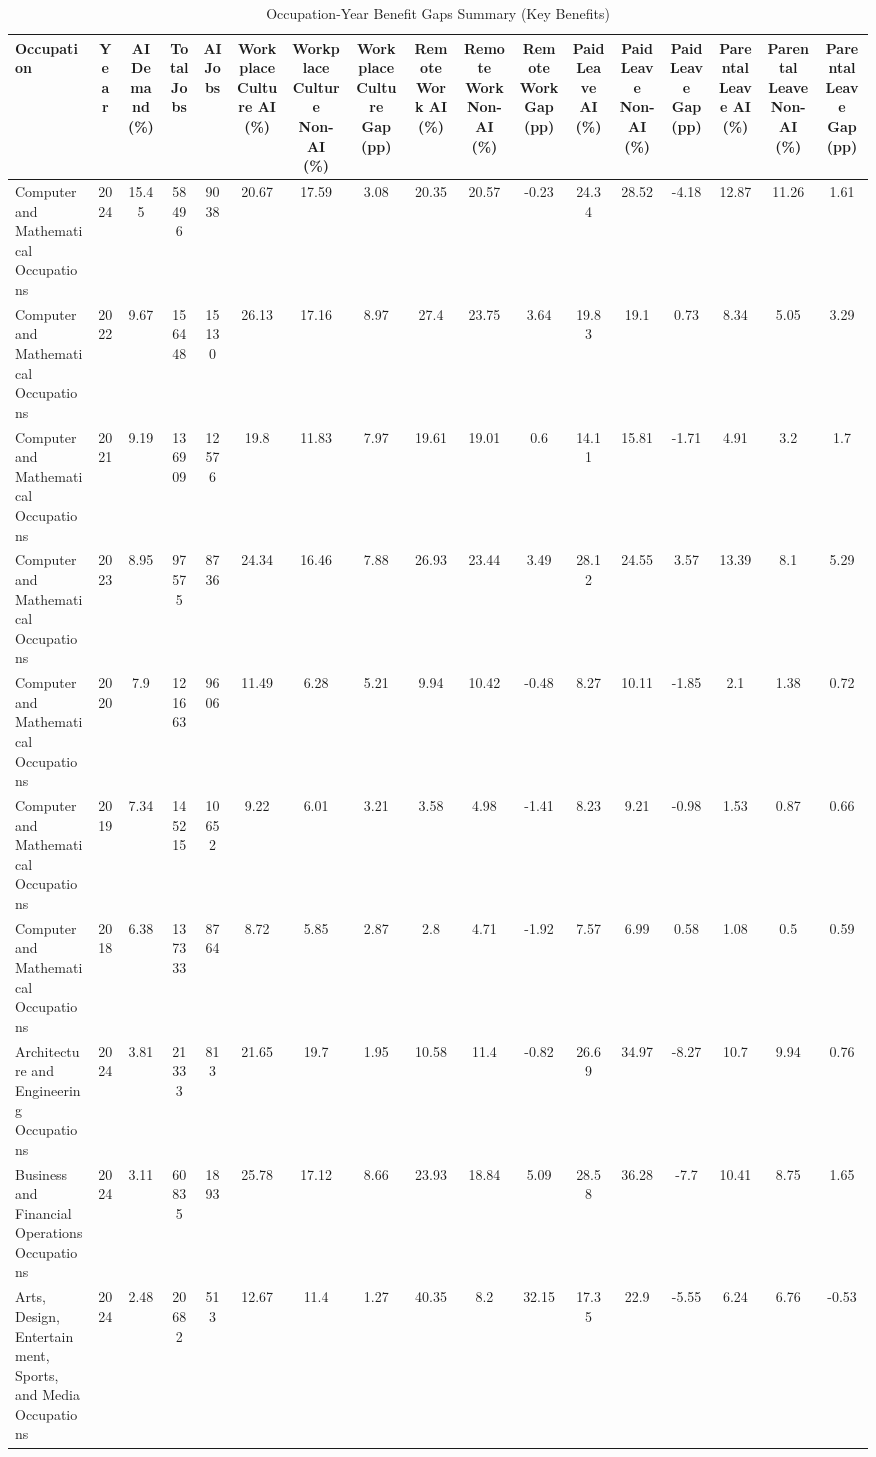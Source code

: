 \begin{landscape}
\begin{table}[htbp]
\scriptsize
\caption{Occupation-Year Benefit Gaps Summary (Key Benefits)}
\label{tab:benefit_gaps_summary}
\begin{tabular}{lcccccccccccccccc}
\hline\hline
Occupation & Year & AI Demand (\%) & Total Jobs & AI Jobs & Workplace Culture AI (\%) & Workplace Culture Non-AI (\%) & Workplace Culture Gap (pp) & Remote Work AI (\%) & Remote Work Non-AI (\%) & Remote Work Gap (pp) & Paid Leave AI (\%) & Paid Leave Non-AI (\%) & Paid Leave Gap (pp) & Parental Leave AI (\%) & Parental Leave Non-AI (\%) & Parental Leave Gap (pp) \\
\hline
Computer and Mathematical Occupations & 2024 & 15.45 & 58496 & 9038 & 20.67 & 17.59 & 3.08 & 20.35 & 20.57 & -0.23 & 24.34 & 28.52 & -4.18 & 12.87 & 11.26 & 1.61 \\
Computer and Mathematical Occupations & 2022 & 9.67 & 156448 & 15130 & 26.13 & 17.16 & 8.97 & 27.4 & 23.75 & 3.64 & 19.83 & 19.1 & 0.73 & 8.34 & 5.05 & 3.29 \\
Computer and Mathematical Occupations & 2021 & 9.19 & 136909 & 12576 & 19.8 & 11.83 & 7.97 & 19.61 & 19.01 & 0.6 & 14.11 & 15.81 & -1.71 & 4.91 & 3.2 & 1.7 \\
Computer and Mathematical Occupations & 2023 & 8.95 & 97575 & 8736 & 24.34 & 16.46 & 7.88 & 26.93 & 23.44 & 3.49 & 28.12 & 24.55 & 3.57 & 13.39 & 8.1 & 5.29 \\
Computer and Mathematical Occupations & 2020 & 7.9 & 121663 & 9606 & 11.49 & 6.28 & 5.21 & 9.94 & 10.42 & -0.48 & 8.27 & 10.11 & -1.85 & 2.1 & 1.38 & 0.72 \\
Computer and Mathematical Occupations & 2019 & 7.34 & 145215 & 10652 & 9.22 & 6.01 & 3.21 & 3.58 & 4.98 & -1.41 & 8.23 & 9.21 & -0.98 & 1.53 & 0.87 & 0.66 \\
Computer and Mathematical Occupations & 2018 & 6.38 & 137333 & 8764 & 8.72 & 5.85 & 2.87 & 2.8 & 4.71 & -1.92 & 7.57 & 6.99 & 0.58 & 1.08 & 0.5 & 0.59 \\
Architecture and Engineering Occupations & 2024 & 3.81 & 21333 & 813 & 21.65 & 19.7 & 1.95 & 10.58 & 11.4 & -0.82 & 26.69 & 34.97 & -8.27 & 10.7 & 9.94 & 0.76 \\
Business and Financial Operations Occupations & 2024 & 3.11 & 60835 & 1893 & 25.78 & 17.12 & 8.66 & 23.93 & 18.84 & 5.09 & 28.58 & 36.28 & -7.7 & 10.41 & 8.75 & 1.65 \\
Arts, Design, Entertainment, Sports, and Media Occupations & 2024 & 2.48 & 20682 & 513 & 12.67 & 11.4 & 1.27 & 40.35 & 8.2 & 32.15 & 17.35 & 22.9 & -5.55 & 6.24 & 6.76 & -0.53 \\

\end{tabular}
\end{table}
\end{landscape}

